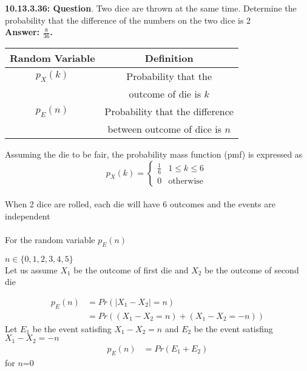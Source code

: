 \documentclass[journal,12pt,twocolumn]{IEEEtran}
\begin{document}
\textbf{10.13.3.36: Question}. Two dice are thrown at the same time. Determine the probability that the difference
of the numbers on the two dice is 2\\
\textbf{Answer: \(\frac{8}{36}\).}\\
\begin{table}[hbp]
  \begin{tabular}{| c | c |}
    \hline
    Random Variable & Definition \\\hline
    $p_X(k)$ &Probability that the\\& outcome of die is $k$\\\hline
    $p_E(n)$ &Probability that the difference\\& between outcome of dice is $n$\\\hline
  \end{tabular}
\end{table}

Assuming the die to be fair, the probability mass function (pmf) is expressed as
 \begin{equation}
p_{X}(k) =  
\begin{cases}
    \frac{1}{6} &  1\leq  k\leq 6  \\
    0  & \text{otherwise } 
\end{cases}
\label{eq:1}
\end{equation}\\

When 2 dice are rolled, each die will have 6 outcomes and the events are independent \\\\
For the random variable $p_E(n)$

$n\in \{0,1,2,3,4,5\}$\\

Let us assume $X_1$ be the outcome of first die and $X_2$ be the outcome of second die

\begin{align}
	p_E(n)&=Pr(|X_1-X_2|=n) \nonumber\\
	&=Pr((X_1-X_2=n)+(X_1-X_2=-n))\nonumber
\end{align} 
Let $E_1$ be the event satisfing $X_1 - X_2 = n$ and $E_2$ be the event satisfing $X_1 - X_2 = -n$
\begin{align}
	p_E(n)&=Pr(E_1+E_2) \nonumber
\end{align} 
for $n$=0
\end{document}
